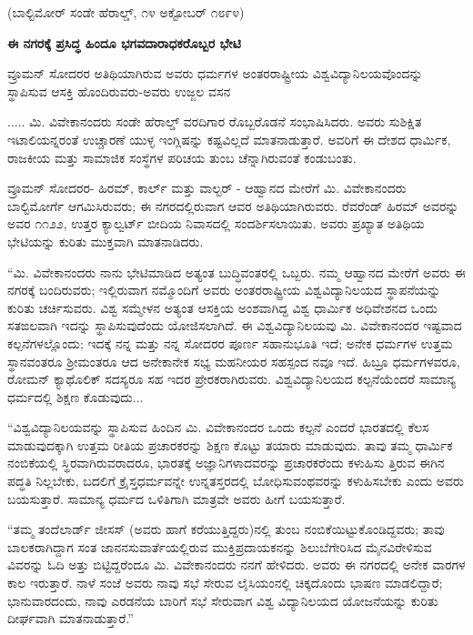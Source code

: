 \begin{center}
(ಬಾಲ್ಟಿಮೋರ್ ಸಂಡೇ ಹೆರಾಲ್ಡ್, ೧೪ ಅಕ್ಟೋಬರ್ ೧೮೯೪)
\end{center}

\begin{center}
\textbf{ಈ ನಗರಕ್ಕೆ ಪ್ರಸಿದ್ಧ ಹಿಂದೂ ಭಗವದಾರಾಧಕರೊಬ್ಬರ ಭೇಟಿ}
\end{center}

ವ್ರೂಮನ್ ಸೋದರರ ಅತಿಥಿಯಾಗಿರುವ ಅವರು ಧರ್ಮಗಳ ಅಂತರರಾಷ್ಟ್ರೀಯ ವಿಶ್ವವಿದ್ಯಾನಿಲಯವೊಂದನ್ನು ಸ್ಥಾಪಿಸುವ ಆಸಕ್ತಿ ಹೊಂದಿರುವರು-ಅವರು ಉಜ್ಜಲ ವಸನ

..... ಮಿ. ವಿವೇಕಾನಂದರು  ಸಂಡೇ ಹೆರಾಲ್ಡ್ ವರದಿಗಾರ ರೊಬ್ಬರೊಡನೆ ಸಂಭಾಷಿಸಿದರು. ಅವರು ಸುಶಿಕ್ಷಿತ ಇಟಾಲಿಯನ್ನರಂತೆ ಉಚ್ಚಾರಣೆ ಯುಳ್ಳ ಇಂಗ್ಲಿಷನ್ನು ಕಷ್ಟವಿಲ್ಲದೆ ಮಾತನಾಡುತ್ತಾರೆ. ಅವರಿಗೆ ಈ ದೇಶದ ಧಾರ್ಮಿಕ, ರಾಜಕೀಯ ಮತ್ತು ಸಾಮಾಜಿಕ ಸಂಸ್ಥೆಗಳ ಪರಿಚಯ ತುಂಬ ಚೆನ್ನಾಗಿರುವಂತೆ ಕಂಡುಬಂತು.

ವ್ರೂಮನ್ ಸೋದರರ- ಹಿರಮ್​, ಕಾರ್ಲ್ ಮತ್ತು ವಾಲ್ಟರ್ - ಆಹ್ವಾನದ ಮೇರೆಗೆ ಮಿ. ವಿವೇಕಾನಂದರು ಬಾಲ್ಟಿಮೋರ್ಗೆ ಆಗಮಿಸಿರುವರು; ಈ ನಗರದಲ್ಲಿರುವಾಗ ಆವರ ಅತಿಥಿಯಾಗಿರುವರು. ರೆವರೆಂಡ್ ಹಿರಮ್​ ಅವರನ್ನು ಅವರ ೧೧೨೨, ಉತ್ತರ ಕ್ಯಾಲ್ವರ್ಟ್ ಬೀದಿಯ ನಿವಾಸದಲ್ಲಿ ಸಂದರ್ಶಿಸಲಾಯಿತು. ಅವರು ಪ್ರಖ್ಯಾತ ಅತಿಥಿಯ ಭೇಟಿಯನ್ನು ಕುರಿತು ಮುಕ್ತವಾಗಿ ಮಾತನಾಡಿದರು.

“ಮಿ. ವಿವೇಕಾನಂದರು ನಾನು ಭೇಟಿಮಾಡಿದ ಅತ್ಯಂತ ಬುದ್ಧಿವಂತರಲ್ಲಿ ಒಬ್ಬರು. ನಮ್ಮ ಆಹ್ವಾನದ ಮೇರೆಗೆ ಅವರು ಈ ನಗರಕ್ಕೆ ಬಂದಿರುವರು; ಇಲ್ಲಿರುವಾಗ ನಮ್ಮೊಂದಿಗೆ ಅವರು ಅಂತರರಾಷ್ಟ್ರೀಯ ವಿಶ್ವವಿದ್ಯಾನಿಲಯದ ಸ್ಥಾಪನೆಯನ್ನು ಕುರಿತು ಚರ್ಚಿಸುವರು. ವಿಶ್ವ ಸಮ್ಮೇಳನ ಅತ್ಯಂತ ಆಸಕ್ತಿಯ ಅಂಶವಾಗಿದ್ದ ವಿಶ್ವ ಧಾರ್ಮಿಕ ಅಧಿವೇಶನದ ಒಂದು ಸತಙಲವಾಗಿ ಇದನ್ನು ಸ್ಥಾಪಿಸುವುದೆಂದು ಯೋಜಿಸಲಾಗಿದೆ. ಈ ವಿಶ್ವವಿದ್ಯಾನಿಲಯವು ಮಿ. ವಿವೇಕಾನಂದರ ಇಷ್ಟವಾದ ಕಲ್ಪನೆಗಳಲ್ಲೊಂದು; ಇದಕ್ಕೆ ನನ್ನ ಮತ್ತು ನನ್ನ ಸೋದರರ ಪೂರ್ಣ ಸಹಾನುಭೂತಿ ಇದೆ; ಅನೇಕ ಧರ್ಮಗಳ ಉತ್ತಮ ಸ್ಥಾನವಂತರೂ ಶ‍್ರೀಮಂತರೂ ಆದ ಅನೇಕಾನೇಕ ಸಭ್ಯ ಮಹನೀಯರ ಸಹಸ್ಪಂದ ನವೂ ಇದೆ. ಹಿಬ್ರೂ ಧರ್ಮಗಳವರೂ, ರೋಮನ್ ಕ್ಯಾಥೊಲಿಕ್ ಸದಸ್ಯರೂ ಸಹ ಇದರ ಪ್ರೇರಕರಾಗಿರುವರು. ವಿಶ್ವವಿದ್ಯಾನಿಲಯದ ಕಲ್ಪನೆಯೆಂದರೆ ಸಾಮಾನ್ಯ ಧರ್ಮದಲ್ಲಿ ಶಿಕ್ಷಣ ಕೊಡುವುದು...

“ವಿಶ್ವವಿದ್ಯಾನಿಲಯವನ್ನು ಸ್ಥಾಪಿಸುವ ಹಿಂದಿನ ಮಿ. ವಿವೇಕಾನಂದರ ಒಂದು ಕಲ್ಪನೆ ಎಂದರೆ ಭಾರತದಲ್ಲಿ ಕೆಲಸ ಮಾಡುವುದಕ್ಕಾಗಿ ಉತ್ತಮ ರೀತಿಯ ಪ್ರಚಾರಕರನ್ನು ಶಿಕ್ಷಣ ಕೊಟ್ಟು ತಯಾರು ಮಾಡುವುದು. ತಾವು ತಮ್ಮ ಧಾರ್ಮಿಕ ನಂಬಿಕೆಯಲ್ಲಿ ಸ್ಥಿರವಾಗಿರುವರಾದರೂ, ಭಾರತಕ್ಕೆ ಅಜ್ಞಾನಿಗಳಾದವರನ್ನು ಪ್ರಚಾರಕರೆಂದು ಕಳುಹಿಸು ತ್ತಿರುವ ಈಗಿನ ಪದ್ಧತಿ ನಿಲ್ಲಬೇಕು, ಬದಲಿಗೆ ಕ್ರೈಸ್ತಧರ್ಮವನ್ನೇ ಉನ್ನತಸ್ತರದಲ್ಲಿ ಬೋಧಿಸುವಂಥವರನ್ನು ಕಳುಹಿಸಬೇಕು ಎಂದು ಅವರು ಬಯಸುತ್ತಾರೆ. ಸಾಮಾನ್ಯ ಧರ್ಮದ ಒಳಿತಿಗಾಗಿ ಮಾತ್ರವೇ ಅವರು ಹೀಗೆ ಬಯಸುತ್ತಾರೆ.

“ತಮ್ಮ ತಂದೆಲಾರ್ಡ್ ಜೀಸಸ್ (ಅವರು ಹಾಗೆ ಕರೆಯುತ್ತಿದ್ದರು)ನಲ್ಲಿ ತುಂಬ ನಂಬಿಕೆಯಿಟ್ಟುಕೊಂಡಿದ್ದವರು; ತಾವು ಬಾಲಕರಾಗಿದ್ದಾಗ ಸಂತ ಜಾನನಸುವಾರ್ತೆಯಲ್ಲಿರುವ ಮುಕ್ತಿಪ್ರದಾಯಕನನ್ನು ಶಿಲುಬೆಗೇರಿಸಿದ ಮೈನವಿರೇಳಿಸುವ ವಿವರನ್ನು ಓದಿ ಅತ್ತು ಬಿಟ್ಟಿದ್ದರೆಂದೂ ಮಿ. ವಿವೇಕಾನಂದರು ನನಗೆ ಹೇಳಿದರು. ಅವರು ಈ ನಗರದಲ್ಲಿ ಅನೇಕ ವಾರಗಳ ಕಾಲ ಇರುತ್ತಾರೆ. ನಾಳೆ ಸಂಜೆ ಅವರು ನಾವು ಸಭೆ ಸೇರುವ ಲೈಸಿಯಂನಲ್ಲಿ ಚಿಕ್ಕದೊಂದು ಭಾಷಣ ಮಾಡಲಿದ್ದಾರೆ; ಭಾನುವಾರದಂದು, ನಾವು ಎರಡನೆಯ ಬಾರಿಗೆ ಸಭೆ ಸೇರುವಾಗ ವಿಶ್ವ ವಿದ್ಯಾನಿಲಯದ ಯೋಜನೆಯನ್ನು ಕುರಿತು ದೀರ್ಘವಾಗಿ ಮಾತನಾಡುತ್ತಾರೆ.”

